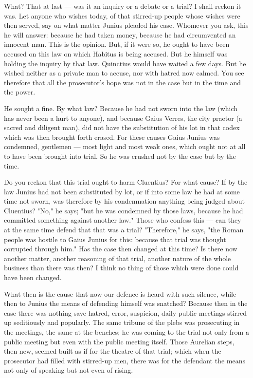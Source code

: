  What? That at last --- was it an inquiry or a debate or a trial? I shall reckon it was. Let anyone who wishes today, of that stirred-up people whose wishes were then served, say on what matter Junius pleaded his case. Whomever you ask, this he will answer: because he had taken money, because he had circumvented an innocent man. This is the opinion. But, if it were so, he ought to have been accused on this law on which Habitus is being accused. But he himself was holding the inquiry by that law. Quinctius would have waited a few days. But he wished neither as a private man to accuse, nor with hatred now calmed. You see therefore that all the prosecutor's hope was not in the case but in the time and the power.

 He sought a fine. By what law? Because he had not sworn into the law (which has never been a hurt to anyone), and because Gaius Verres, the city praetor (a sacred and diligent man), did not have the substitution of his lot in that codex which was then brought forth erased. For these causes Gaius Junius was condemned, gentlemen --- most light and most weak ones, which ought not at all to have been brought into trial. So he was crushed not by the case but by the time.

 Do you reckon that this trial ought to harm Cluentius? For what cause? If by the law Junius had not been substituted by lot, or if into some law he had at some time not sworn, was therefore by his condemnation anything being judged about Cluentius? "No," he says; "but he was condemned by those laws, because he had committed something against another law." Those who confess this --- can they at the same time defend that that was a trial? "Therefore," he says, "the Roman people was hostile to Gaius Junius for this: because that trial was thought corrupted through him." Has the case then changed at this time? Is there now another matter, another reasoning of that trial, another nature of the whole business than there was then? I think no thing of those which were done could have been changed.

 What then is the cause that now our defence is heard with such silence, while then to Junius the means of defending himself was snatched? Because then in the case there was nothing save hatred, error, suspicion, daily public meetings stirred up seditiously and popularly. The same tribune of the plebs was prosecuting in the meetings, the same at the benches; he was coming to the trial not only from a public meeting but even with the public meeting itself. Those Aurelian steps, then new, seemed built as if for the theatre of that trial; which when the prosecutor had filled with stirred-up men, there was for the defendant the means not only of speaking but not even of rising.

